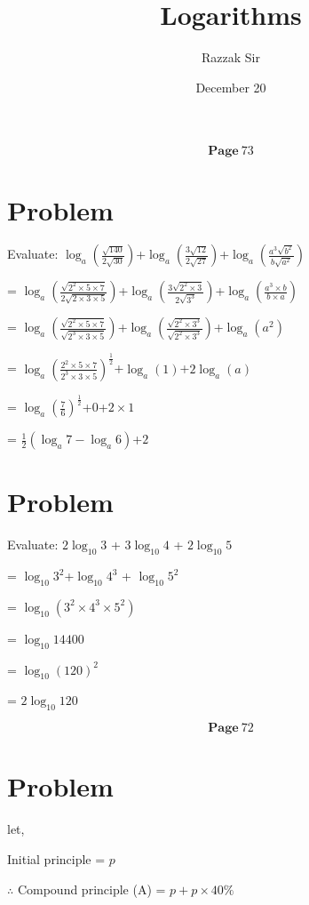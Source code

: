 \documentclass{report}
\title{Logarithms}
\author{Razzak Sir}
\date{December 20}
\begin{document}
\maketitle{}
 $$\textbf{Page} \: 73$$
          

\section{Problem}
Evaluate:
$\log_{a} \left(\frac {\sqrt{140}}{2\sqrt{30}} \right)$+$\log_{a} \left(\frac {3\sqrt{12}}{2\sqrt{27}} \right)$+$\log_{a} \left(\frac {a^{3}\sqrt{b^{2}}}
{b\sqrt{a^{2}}} \right)$

= $\log_{a} \left(\frac {\sqrt{2^{2}\times5\times7}}{2\sqrt{2\times3\times5}} \right)$+$\log_{a} \left(\frac {3\sqrt{2^{2}\times3}}{2\sqrt{3^{3}}} \right)$+$\log_{a} \left(\frac {a^{3}\times b}
{b\times a} \right)$

= $\log_{a} \left(\frac {\sqrt{2^{2}\times5\times7}}{\sqrt{2^{3}\times3\times5}} \right)$+$\log_{a} \left(\frac {\sqrt{2^{2}\times3^{3}}}{\sqrt{2^{2}\times 3^{3}}} \right)$+$\log_{a}\left(a^{2}\right)$

= $\log_{a} \left(\frac {2^{2}\times5\times7}{2^{3}\times3\times5} \right)^ {\frac{1}{2}}$+$\log_{a}\left(1\right)$+$2\log_{a}\left(a\right)$

= $\log_{a} \left(\frac {7}{6}\right)^ {\frac{1}{2}}$+$0$+$2\times1$

= $\frac{1}{2}\left(\log_{a} 7-\log_{a} 6\right)$+$2$

\section{Problem}
Evaluate:
$2\log_{10} 3$ + $3\log_{10} 4$ + $2\log_{10} 5$

= $\log_{10} 3^{2}$+$\log_{10} 4^{3}$ + $\log_{10} 5^{2}$

= $\log_{10} \left(3^{2} \times 4^{3} \times 5^{2} \right)$

= $\log_{10}14400$

= $\log_{10} (120)^{2}$

= $2\log_{10} 120$

  $$\textbf{Page} \: 72$$

   \section{Problem}
let,

Initial principle = $p$

$\therefore$ Compound principle (A) = $p+ p\times 40 \% $
\end{document}
